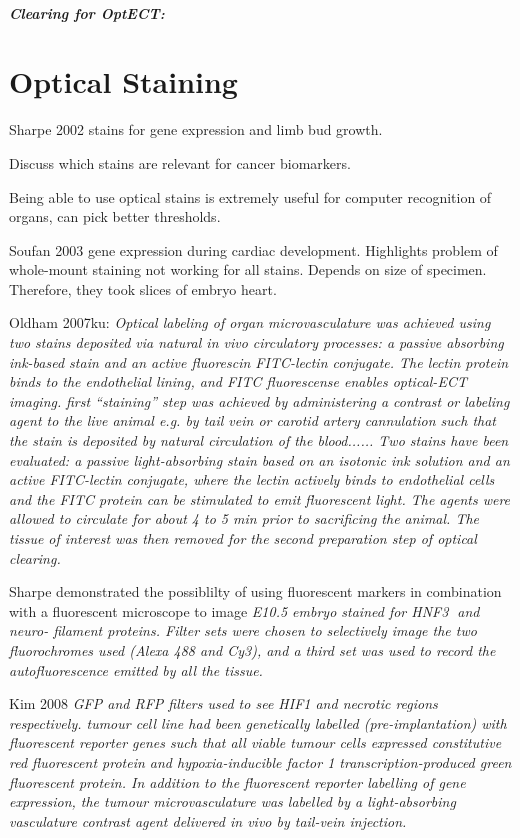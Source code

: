 \documentclass[12pt]{article}
\begin{document}
\subparagraph{Clearing for OptECT:}
\cite{Oldham:2008dfa}
\cite{Sakhalkar:2007hp} 





\newpage
\section{Optical Staining}
Sharpe 2002 stains for gene expression and limb bud growth. 

Discuss which stains are relevant for cancer biomarkers. \cite{Hanahan:2011gua}

Being able to use optical stains is extremely useful for computer recognition of organs, can pick better thresholds. \cite{Sharpe:2003cm}

Soufan 2003 \cite{Soufan:2003cd} gene expression during cardiac development. 
Highlights problem of whole-mount staining not working for all stains. Depends on size of specimen. Therefore, they took slices of embryo heart.

Oldham 2007ku: \textit{Optical labeling of organ microvasculature was achieved using two stains deposited via natural in vivo circulatory processes: a passive absorbing ink-based stain and an active fluorescin FITC-lectin conjugate. The lectin protein binds to the endothelial lining, and FITC fluorescense enables optical-ECT imaging.}
\textit{first “staining” step was achieved by administering a contrast or labeling agent to the live animal e.g. by tail vein or carotid artery cannulation such that the stain is deposited by natural   circulation of the blood...... Two   stains   have   been   evaluated:   a   passive   light-absorbing stain based on an isotonic ink solution and an active FITC-lectin conjugate, where the lectin actively binds to endothelial cells and the FITC protein can be stimulated to emit fluorescent   light.   The   agents   were   allowed   to   circulate   for about 4 to 5 min prior to sacrificing the animal. The tissue of interest was then removed for the second preparation step of optical clearing.
}


Sharpe demonstrated the possiblilty of using fluorescent markers in combination with a fluorescent microscope to image \textit{E10.5 embryo stained for HNF3 and neuro- filament   proteins.   Filter   sets   were   chosen   to selectively image the two fluorochromes used (Alexa 488 and Cy3), and a third set was used to record the autofluorescence emitted by all the
 tissue.}

Kim 2008 \textit{GFP and RFP filters used to see HIF1 and necrotic regions respectively.
tumour cell line had been genetically labelled (pre-implantation) with fluorescent reporter genes such that all viable tumour cells expressed constitutive red fluorescent protein and hypoxia-inducible factor 1   transcription-produced   green   fluorescent   protein.   In   addition   to   the fluorescent reporter labelling of gene expression, the tumour microvasculature was labelled by a light-absorbing vasculature contrast agent delivered in vivo by tail-vein injection.
}
\end{document}
